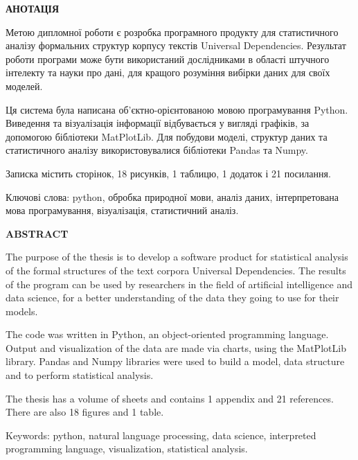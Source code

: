 \thispagestyle{empty}
\begin{center}
\textbf{\Large АНОТАЦІЯ}
\end{center}

Метою дипломної роботи є розробка програмного продукту для статистичного
аналізу формальних структур корпусу текстів Universal Dependencies.
Результат роботи програми може бути використаний дослідниками в області
штучного інтелекту та науки про дані, для кращого розуміння вибірки даних
для своїх моделей. 

Ця система була написана об’єктно-орієнтованою мовою програмування Python.
Виведення та візуалізація інформації відбувається у вигляді графіків, за
допомогою бібліотеки MatPlotLib. Для побудови моделі, структур даних
та статистичного аналізу використовувалися бібліотеки Pandas та Numpy.

Записка містить \pageref{LastPage} сторінок, 18 рисунків, 1 таблицю, 1 додаток і 21 посилання.

Ключові слова: python, обробка природної мови, аналіз даних, інтерпретована мова
програмування, візуалізація, статистичний аналіз.

\newpage
\thispagestyle{empty}

\begin{center}
\textbf{\Large ABSTRACT}
\end{center}

The purpose of the thesis is to develop a software product for statistical
analysis of the formal structures of the text corpora Universal Dependencies.
The results of the program can be used by researchers in the field of
artificial intelligence and data science, for a better understanding of
the data they going to use for their models.

The code was written in Python, an object-oriented programming language.
Output and visualization of the data are made via charts, using the MatPlotLib
library. Pandas and Numpy libraries were used to build a model, data structure
and to perform statistical analysis.

The thesis has a volume of \pageref{LastPage} sheets and contains 1 appendix and 21
references. There are also 18 figures and 1 table.

Keywords: python, natural language processing, data science, interpreted
programming language, visualization, statistical analysis.